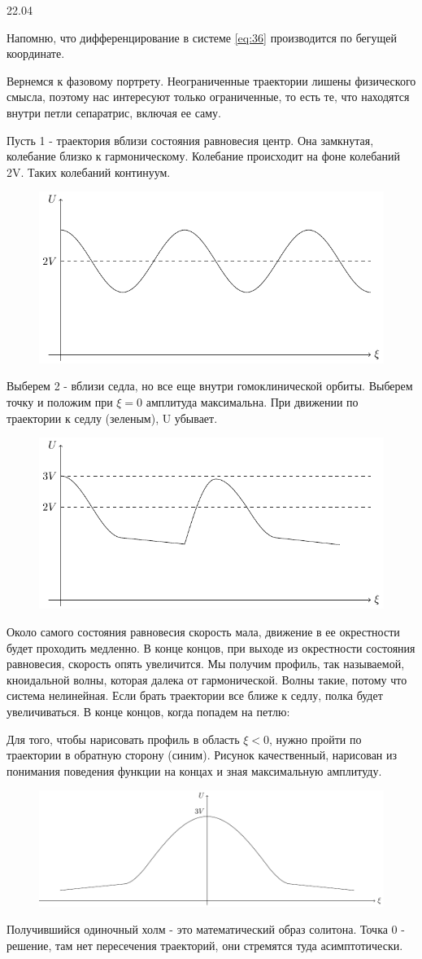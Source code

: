 22.04

Напомню, что дифференцирование в системе \eqref{eq:36} производится по бегущей координате. 

Вернемся к фазовому портрету. Неограниченные траектории лишены физического смысла, поэтому нас интересуют только ограниченные, то есть те, что находятся внутри петли сепаратрис, включая ее саму.

Пусть 1 - траектория вблизи состояния равновесия центр. Она замкнутая, колебание близко к гармоническому. Колебание происходит на фоне колебаний 2V. Таких колебаний континуум. 
\begin{figure}[H]
	\centering
	\includegraphics[width=0.4\linewidth]{fig/fig21.pdf}   
\end{figure}

Выберем 2 - вблизи седла, но все еще внутри гомоклинической орбиты. Выберем точку и положим при $\xi=0$ амплитуда максимальна. При движении по траектории к седлу (зеленым), U убывает. 
\begin{figure}[H]
	\centering
	\includegraphics[width=0.4\linewidth]{fig/fig22.pdf}   
\end{figure}
Около самого состояния равновесия скорость мала, движение в ее окрестности будет проходить медленно. В конце концов, при выходе из окрестности состояния равновесия, скорость опять увеличится. Мы получим профиль, так называемой, кноидальной волны, которая далека от гармонической. Волны такие, потому что система нелинейная. 
Если брать траектории все ближе к седлу, полка будет увеличиваться. В конце концов, когда попадем на петлю:

Для того, чтобы нарисовать профиль в область $\xi<0$, нужно пройти по траектории в обратную сторону (синим). Рисунок качественный, нарисован из понимания поведения функции на концах и зная максимальную амплитуду. 
\begin{figure}[H]
	\centering
	\includegraphics[width=0.4\linewidth]{fig/fig23.pdf}   
\end{figure}
Получившийся одиночный холм - это математический образ солитона. Точка 0 - решение, там нет пересечения траекторий, они стремятся туда асимптотически. 

